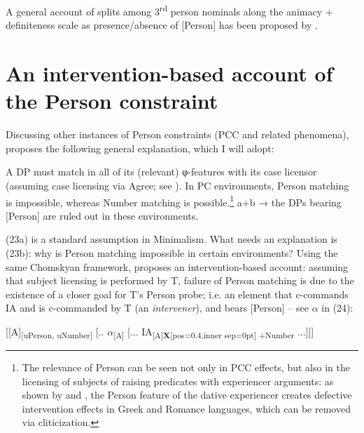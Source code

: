\documentclass[output=paper]{langsci/langscibook}
\begin{document}
A general account of splits among 3\textsuperscript{rd} person nominals along the animacy + definiteness scale as presence\slash absence of [Person] has been proposed by \citet{Richards2008}.

\section{An intervention-based account of the Person constraint}%

Discussing other instances of Person constraints (PCC and related phenomena), \citet{Rezac2011} proposes the following general explanation, which I will adopt:

\ea\label{ex:guirgea:23}\label{bkm:Ref443240869}
        \ea A DP must match in all of its (relevant) φ-features with its case licensor (assuming case licensing via Agree; see \citealt{Chomsky2000,Chomsky2001Derivation}).
        \ex In PC environments, Person matching is impossible, whereas Number matching is possible.\footnote{The relevance of Person can be seen not only in PCC effects, but also in the licensing of subjects of raising predicates with experiencer arguments: as shown by \citet{Anagnostopoulou2003,Anagnostopoulou2005Cross} and \citet{Marchis2013}, the Person feature of the dative experiencer creates defective intervention effects in Greek and Romance languages, which can be removed via cliticization.}  
        \ex  a+b → the DPs bearing [Person] are ruled out in these environments.
        \z
\z

(23a) is a standard assumption in Minimalism. What needs an explanation is (23b): why is Person matching impossible in certain environments? Using the same Chomskyan framework, \citet{Rezac2011} proposes an intervention-based account: assuming that subject licensing is performed by T, failure of Person matching is due to the existence of a closer goal for T’s Person probe; i.e. an element that c-commands IA and is c-commanded by T (an \textit{intervener}), and bears [Person] – see $\alpha $ in (24):

\ea%
    \label{ex:giurgea:24}
    [[A]\textsubscript{[uPerson, uNumber]}  [.. $\alpha $\textsubscript{[A]}  [... IA\textsubscript{[A]{\textsf{\bfseries X}}[pos=0.4,inner sep=0pt] +Number} ...]]]
\z
\end{document}
